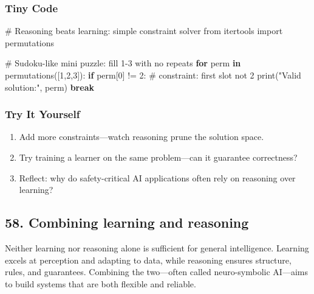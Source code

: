 \documentclass[
  letterpaper,
  DIV=11,
  numbers=noendperiod]{scrreprt}
\newenvironment{Shaded}{\begin{snugshade}}{\end{snugshade}}
\newcommand{\BuiltInTok}[1]{\textcolor[rgb]{0.00,0.23,0.31}{#1}}
\newcommand{\CommentTok}[1]{\textcolor[rgb]{0.37,0.37,0.37}{#1}}
\newcommand{\ControlFlowTok}[1]{\textcolor[rgb]{0.00,0.23,0.31}{\textbf{#1}}}
\newcommand{\DecValTok}[1]{\textcolor[rgb]{0.68,0.00,0.00}{#1}}
\newcommand{\ImportTok}[1]{\textcolor[rgb]{0.00,0.46,0.62}{#1}}
\newcommand{\KeywordTok}[1]{\textcolor[rgb]{0.00,0.23,0.31}{\textbf{#1}}}
\newcommand{\NormalTok}[1]{\textcolor[rgb]{0.00,0.23,0.31}{#1}}
\newcommand{\OperatorTok}[1]{\textcolor[rgb]{0.37,0.37,0.37}{#1}}
\newcommand{\StringTok}[1]{\textcolor[rgb]{0.13,0.47,0.30}{#1}}
\providecommand{\tightlist}{%
  \setlength{\itemsep}{0pt}\setlength{\parskip}{0pt}}
\begin{document}
\subsubsection{Tiny Code}\label{tiny-code-56}

\begin{Shaded}
\begin{Highlighting}[]
\CommentTok{\# Reasoning beats learning: simple constraint solver}
\ImportTok{from}\NormalTok{ itertools }\ImportTok{import}\NormalTok{ permutations}

\CommentTok{\# Sudoku{-}like mini puzzle: fill 1{-}3 with no repeats}
\ControlFlowTok{for}\NormalTok{ perm }\KeywordTok{in}\NormalTok{ permutations([}\DecValTok{1}\NormalTok{,}\DecValTok{2}\NormalTok{,}\DecValTok{3}\NormalTok{]):}
    \ControlFlowTok{if}\NormalTok{ perm[}\DecValTok{0}\NormalTok{] }\OperatorTok{!=} \DecValTok{2}\NormalTok{:  }\CommentTok{\# constraint: first slot not 2}
        \BuiltInTok{print}\NormalTok{(}\StringTok{"Valid solution:"}\NormalTok{, perm)}
        \ControlFlowTok{break}
\end{Highlighting}
\end{Shaded}

\subsubsection{Try It Yourself}\label{try-it-yourself-56}

\begin{enumerate}
\def\labelenumi{\arabic{enumi}.}
\tightlist
\item
  Add more constraints---watch reasoning prune the solution space.
\item
  Try training a learner on the same problem---can it guarantee
  correctness?
\item
  Reflect: why do safety-critical AI applications often rely on
  reasoning over learning?
\end{enumerate}

\subsection{58. Combining learning and
reasoning}\label{combining-learning-and-reasoning}

Neither learning nor reasoning alone is sufficient for general
intelligence. Learning excels at perception and adapting to data, while
reasoning ensures structure, rules, and guarantees. Combining the
two---often called neuro-symbolic AI---aims to build systems that are
both flexible and reliable.
\end{document}
